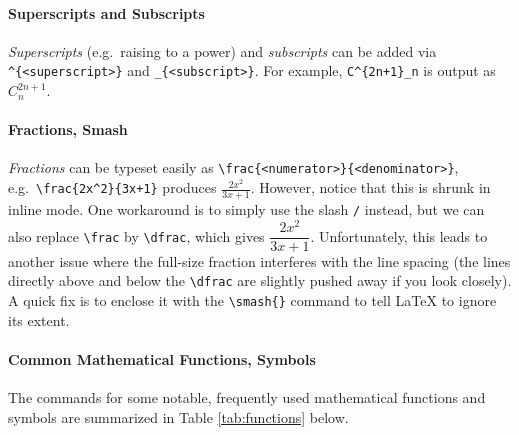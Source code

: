 \paragraph{Superscripts and Subscripts}
\textit{Superscripts} (e.g.\ raising to a power) and \textit{subscripts} can be added via \texttt{\^{}\{<superscript>\}}\index{\texttt{\^}} and \texttt{\_\{<subscript>\}}\index{\texttt{\_}}. For example, \verb|C^{2n+1}_n| is output as $C^{2n+1}_n$.

\paragraph{Fractions, Smash}
\textit{Fractions} can be typeset easily as \texttt{\textbackslash frac\{<numerator>\}\allowbreak\{<denominator>\}}, e.g.\ \texttt{\textbackslash frac\{2x\^{}2\}\{3x+1\}} produces $\frac{2x^2}{3x+1}$. However, notice that this is shrunk in inline mode. One workaround is to simply use the slash \texttt{/} instead, but we can also replace \texttt{\textbackslash frac} by \texttt{\textbackslash dfrac}, which gives $\dfrac{2x^2}{3x+1}$. Unfortunately, this leads to another issue where the full-size fraction interferes with the line spacing (the lines directly above and below the \texttt{\textbackslash dfrac} are slightly pushed away if you look closely). A quick fix is to enclose it with the \texttt{\textbackslash smash\{\}} command to tell \LaTeX{} to ignore its extent.

\paragraph{Common Mathematical Functions, Symbols}
The commands for some notable, frequently used mathematical functions and symbols are summarized in Table \ref{tab:functions} below.

